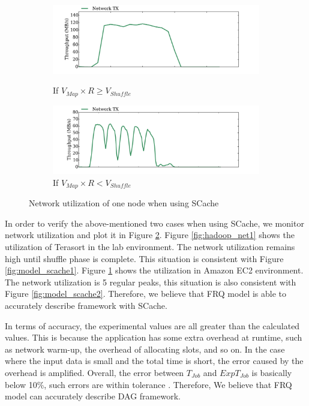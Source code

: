 {\begin{figure}
	\centering
	\begin{minipage}[hb]{\linewidth}
		\begin{subfigure}{\linewidth}
			\begin{minipage}{\linewidth}
				\includegraphics[width=\linewidth]{fig/hadoop_net1}
				\caption{\color{blue}If \(V_{Map} \times R \ge V_{Shuffle}\)}
				\label{fig:hadoop_net1}
			\end{minipage}
			\begin{minipage}{\linewidth}
				\includegraphics[width=\linewidth]{fig/hadoop_net2}
				\caption{\color{blue}If \(V_{Map} \times R < V_{Shuffle}\)}
				\label{fig:hadoop_net2}
			\end{minipage}
		\end{subfigure}
		\caption{\color{blue}Network utilization of one node when using SCache}
		\label{fig:hadoop_net}
	\end{minipage}
\end{figure}

In order to verify the above-mentioned two cases when using SCache, we monitor network utilization and plot it in Figure \ref{fig:hadoop_net}. Figure \ref{fig:hadoop_net1} shows the utilization of Terasort in the lab environment. The network utilization remains high until shuffle phase is complete. This situation is consistent with Figure \ref{fig:model_scache1}. Figure \ref{fig:hadoop_net2} shows the utilization in Amazon EC2 environment. The network utilization is 5 regular peaks, this situation is also consistent with Figure \ref{fig:model_scache2}. Therefore, we believe that FRQ model is able to accurately describe framework with SCache.

In terms of accuracy, the experimental values are all greater than the calculated values. This is because the application has some extra overhead at runtime, such as network warm-up, the overhead of allocating slots, and so on. In the case where the input data is small and the total time is short, the error caused by the overhead is amplified. Overall, the error between \(T_{Job}\) and \(ExpT_{Job}\) is basically below 10\%, such errors are within tolerance . Therefore, We believe that FRQ model can accurately describe DAG framework.
}